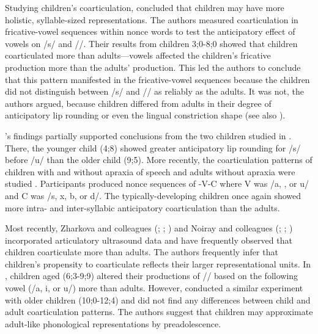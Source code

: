 \documentclass[a4paper,man,floatsintext,natbib,donotrepeattitle, apacite]{apa6}
\begin{document}
Studying children's coarticulation, \citet{nittrouerEmergencePhoneticSegments1989} concluded that children may have more holistic, syllable-sized representations. The authors measured coarticulation in fricative-vowel sequences within nonce words to test the anticipatory effect of vowels on /s/ and /\textesh/. Their results from children 3;0-8;0 showed that children coarticulated more than adults---vowels affected the children's fricative production more than the adults' production. This led the authors to conclude that this pattern manifested in the fricative-vowel sequences because the children did not distinguish between /s/ and /\textesh/ as reliably as the adults. It was not, the authors argued, because children differed from adults in their degree of anticipatory lip rounding or even the lingual constriction shape (see also \citealt{nittrouerHowChildrenLearn1996}).

\citet{nittrouerEmergencePhoneticSegments1989}'s findings partially supported conclusions from the two children studied in \citet{reppObservationsDevelopmentAnticipatory1986}. There, the younger child (4;8) showed greater anticipatory lip rounding for /s/ before /u/ than the older child (9;5). More recently, the coarticulation patterns of children with and without apraxia of speech and adults without apraxia were studied \citep{nijlandCoarticulationPatternsChildren2002}. Participants produced nonce sequences of \textschwa-V-C where V was /a, \textsci, or u/ and C was /s, x, b, or d/. The typically-developing children once again showed more intra- and inter-syllabic anticipatory coarticulation than the adults.

Most recently, Zharkova and colleagues (\citealt{zharkovaCoarticulationIndicatorSpeech2011}; \citealt{zharkovaSpatialTemporalLingual2014}; \citealt{zharkovaDynamicsVoicelessSibilant2018}) and Noiray and colleagues (\citealt{noirayHowChildrenOrganize2018}; \citealt{noirayBackFutureNonlinear2019}; \citealt{rubertusDevelopmentGesturalOrganization2018}) incorporated articulatory ultrasound data and have frequently observed that children coarticulate more than adults. The authors frequently infer that children's propensity to coarticulate reflects their larger representational units. In \citet{zharkovaCoarticulationIndicatorSpeech2011}, children aged (6;3-9;9) altered their productions of /\textesh/ based on the following vowel (/a, i, or u/) more than adults. However, \citet{zharkovaSpatialTemporalLingual2014} conducted a similar experiment with older children (10;0-12;4) and did not find any differences between child and adult coarticulation patterns. The authors suggest that children may approximate adult-like phonological representations by preadolescence. 
\end{document}
